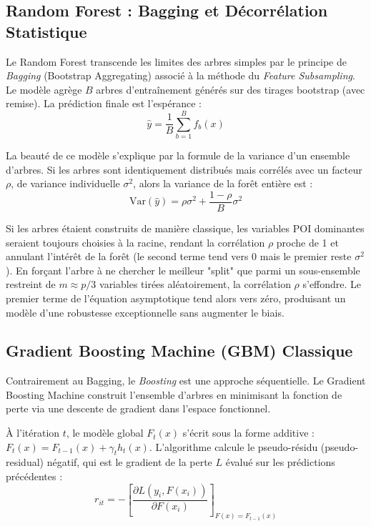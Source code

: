 \documentclass[11pt,a4paper,twoside]{report}
\begin{document}
\subsection{Random Forest : Bagging et Décorrélation Statistique}

Le Random Forest \cite{breiman2001} transcende les limites des arbres simples par le principe de \textit{Bagging} (Bootstrap Aggregating) associé à la méthode du \textit{Feature Subsampling}.
Le modèle agrège $B$ arbres d'entraînement générés sur des tirages bootstrap (avec remise). La prédiction finale est l'espérance :
\begin{equation}
\hat{y} = \frac{1}{B} \sum_{b=1}^{B} f_b(x)
\end{equation}

La beauté de ce modèle s'explique par la formule de la variance d'un ensemble d'arbres. Si les arbres sont identiquement distribués mais corrélés avec un facteur $\rho$, de variance individuelle $\sigma^2$, alors la variance de la forêt entière est :
\begin{equation}
\text{Var}(\hat{y}) = \rho \sigma^2 + \frac{1-\rho}{B}\sigma^2
\end{equation}

Si les arbres étaient construits de manière classique, les variables POI dominantes seraient toujours choisies à la racine, rendant la corrélation $\rho$ proche de 1 et annulant l'intérêt de la forêt (le second terme tend vers 0 mais le premier reste $\sigma^2$).
En forçant l'arbre à ne chercher le meilleur "split" que parmi un sous-ensemble restreint de $m \approx p/3$ variables tirées aléatoirement, la corrélation $\rho$ s'effondre. Le premier terme de l'équation asymptotique tend alors vers zéro, produisant un modèle d'une robustesse exceptionnelle sans augmenter le biais.

\subsection{Gradient Boosting Machine (GBM) Classique}

Contrairement au Bagging, le \textit{Boosting} est une approche séquentielle. Le Gradient Boosting Machine \cite{friedman2001} construit l'ensemble d'arbres en minimisant la fonction de perte via une descente de gradient dans l'espace fonctionnel.

À l'itération $t$, le modèle global $F_t(x)$ s'écrit sous la forme additive : $F_t(x) = F_{t-1}(x) + \gamma_t h_t(x)$. L'algorithme calcule le pseudo-résidu (pseudo-residual) négatif, qui est le gradient de la perte $L$ évalué sur les prédictions précédentes :
\begin{equation}
r_{it} = - \left[ \frac{\partial L(y_i, F(x_i))}{\partial F(x_i)} \right]_{F(x) = F_{t-1}(x)}
\end{equation}
\end{document}
